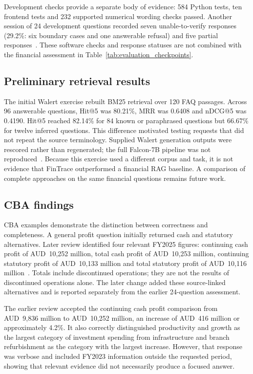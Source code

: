 Development checks provide a separate body of evidence: 584 Python tests, ten frontend tests and 232 supported numerical wording checks passed. Another session of 24 development questions recorded seven unable-to-verify responses (29.2\%: six boundary cases and one answerable refusal) and five partial responses~\cite{fintraceCandidate2026}. These software checks and response statuses are not combined with the financial assessment in Table~\ref{tab:evaluation_checkpoints}.

\subsection{Preliminary retrieval results}
The initial Walert exercise rebuilt BM25 retrieval over 120 FAQ passages. Across 96 answerable questions, Hit@5 was 80.21\%, MRR was 0.6408 and nDCG@5 was 0.4190. Hit@5 reached 82.14\% for 84 known or paraphrased questions but 66.67\% for twelve inferred questions. This difference motivated testing requests that did not repeat the source terminology. Supplied Walert generation outputs were rescored rather than regenerated; the full Falcon-7B pipeline was not reproduced~\cite{fintraceWalert2026}. Because this exercise used a different corpus and task, it is not evidence that FinTrace outperformed a financial RAG baseline. A comparison of complete approaches on the same financial questions remains future work.

\subsection{CBA findings}
CBA examples demonstrate the distinction between correctness and completeness. A general profit question initially returned cash and statutory alternatives. Later review identified four relevant FY2025 figures: continuing cash profit of AUD~10,252 million, total cash profit of AUD~10,253 million, continuing statutory profit of AUD~10,133 million and total statutory profit of AUD~10,116 million~\cite{fintraceCBA2025}. Totals include discontinued operations; they are not the results of discontinued operations alone. The later change added these source-linked alternatives and is reported separately from the earlier 24-question assessment.

The earlier review accepted the continuing cash profit comparison from AUD~9,836 million to AUD~10,252 million, an increase of AUD~416 million or approximately 4.2\%. It also correctly distinguished productivity and growth as the largest category of investment spending from infrastructure and branch refurbishment as the category with the largest increase. However, that response was verbose and included FY2023 information outside the requested period, showing that relevant evidence did not necessarily produce a focused answer.

